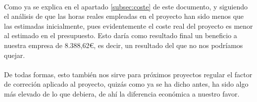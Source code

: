 \paragraph{}Como ya se explica en el apartado \ref{subsec:coste} de este documento, y siguiendo el análisis de que las horas reales empleadas en el proyecto han sido menos que las estimadas inicialmente, pues evidentemente el coste real del proyecto es menor al estimado en el presupuesto. Esto daría como resultado final un beneficio a nuestra empresa de 8.388,62\euro, es decir, un resultado del que no nos podríamos quejar.

\paragraph{} De todas formas, esto también nos sirve para próximos proyectos regular el factor de correción aplicado al proyecto, quizás como ya se ha dicho antes, ha sido algo más elevado de lo que debiera, de ahí la diferencia económica a nuestro favor.